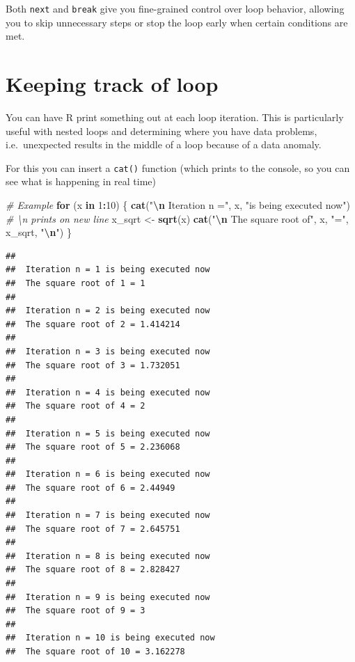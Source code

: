 \documentclass[
]{book}
\newenvironment{Shaded}{\begin{snugshade}}{\end{snugshade}}
\newcommand{\CommentTok}[1]{\textcolor[rgb]{0.56,0.35,0.01}{\textit{#1}}}
\newcommand{\ControlFlowTok}[1]{\textcolor[rgb]{0.13,0.29,0.53}{\textbf{#1}}}
\newcommand{\DecValTok}[1]{\textcolor[rgb]{0.00,0.00,0.81}{#1}}
\newcommand{\FunctionTok}[1]{\textcolor[rgb]{0.13,0.29,0.53}{\textbf{#1}}}
\newcommand{\NormalTok}[1]{#1}
\newcommand{\OtherTok}[1]{\textcolor[rgb]{0.56,0.35,0.01}{#1}}
\newcommand{\SpecialCharTok}[1]{\textcolor[rgb]{0.81,0.36,0.00}{\textbf{#1}}}
\newcommand{\StringTok}[1]{\textcolor[rgb]{0.31,0.60,0.02}{#1}}
\begin{document}
Both \texttt{next} and \texttt{break} give you fine-grained control over loop behavior, allowing you to skip unnecessary steps or stop the loop early when certain conditions are met.

\section{Keeping track of loop}\label{keeping-track-of-loop}

You can have R print something out at each loop iteration. This is particularly useful with nested loops and determining where you have data problems, i.e.~unexpected results in the middle of a loop because of a data anomaly.

For this you can insert a \texttt{cat()} function (which prints to the console, so you can see what is happening in real time)

\begin{Shaded}
\begin{Highlighting}[]
\CommentTok{\# Example}
\ControlFlowTok{for}\NormalTok{ (x }\ControlFlowTok{in} \DecValTok{1}\SpecialCharTok{:}\DecValTok{10}\NormalTok{) \{}
  \FunctionTok{cat}\NormalTok{(}\StringTok{"}\SpecialCharTok{\textbackslash{}n}\StringTok{ Iteration n ="}\NormalTok{, x, }\StringTok{"is being executed now"}\NormalTok{) }\CommentTok{\# \textbackslash{}n prints on new line}
\NormalTok{  x\_sqrt }\OtherTok{\textless{}{-}} \FunctionTok{sqrt}\NormalTok{(x)}
  \FunctionTok{cat}\NormalTok{(}\StringTok{"}\SpecialCharTok{\textbackslash{}n}\StringTok{ The square root of"}\NormalTok{, x, }\StringTok{"="}\NormalTok{, x\_sqrt, }\StringTok{"}\SpecialCharTok{\textbackslash{}n}\StringTok{"}\NormalTok{)}
\NormalTok{\}}
\end{Highlighting}
\end{Shaded}

\begin{verbatim}
## 
##  Iteration n = 1 is being executed now
##  The square root of 1 = 1 
## 
##  Iteration n = 2 is being executed now
##  The square root of 2 = 1.414214 
## 
##  Iteration n = 3 is being executed now
##  The square root of 3 = 1.732051 
## 
##  Iteration n = 4 is being executed now
##  The square root of 4 = 2 
## 
##  Iteration n = 5 is being executed now
##  The square root of 5 = 2.236068 
## 
##  Iteration n = 6 is being executed now
##  The square root of 6 = 2.44949 
## 
##  Iteration n = 7 is being executed now
##  The square root of 7 = 2.645751 
## 
##  Iteration n = 8 is being executed now
##  The square root of 8 = 2.828427 
## 
##  Iteration n = 9 is being executed now
##  The square root of 9 = 3 
## 
##  Iteration n = 10 is being executed now
##  The square root of 10 = 3.162278
\end{verbatim}
\end{document}
